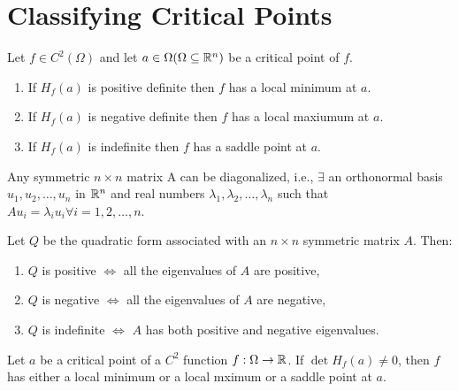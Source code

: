 \chapter{Classifying Critical Points}


\begin{theorem}
    Let $f \in C^2(\Omega)$ and let $a \in \Omega (\Omega \subseteq \mathbb{R}^n)$ be a critical point of $f$.
    \begin{enumerate}
        \item If $H_f(a)$ is positive definite then $f$ has a local minimum at $a$.
        \item If $H_f(a)$ is negative definite then $f$ has a local maxiumum at $a$.
        \item If $H_f(a)$ is indefinite then $f$ has a saddle point at $a$.
    \end{enumerate}
\end{theorem}

\begin{recall}
    Any symmetric $n \times n$ matrix A can be diagonalized, i.e., $\exists$ an orthonormal basis $u_1, u_2, \dots, u_n$ in $\mathbb{R}^n$ and real numbers $\lambda_1, \lambda_2, \dots, \lambda_n$ such that $A u_i = \lambda_i u_i \forall i = 1, 2, \dots, n$.
\end{recall}

\begin{proposition}
    Let $Q$ be the quadratic form associated with an $n \times n$ symmetric matrix $A$. Then:
    \begin{enumerate}
        \item $Q$ is positive $\iff$ all the eigenvalues of $A$ are positive,
        \item $Q$ is negative $\iff$ all the eigenvalues of $A$ are negative,
        \item $Q$ is indefinite $\iff$ $A$ has both positive and negative eigenvalues.
    \end{enumerate}
\end{proposition}

\begin{corollary}
    Let $a$ be a critical point of a $C^2$ function $f: \Omega \to \mathbb{R}$. If $\det H_f(a) \neq 0$, then $f$ has either a local minimum or a local mximum or a saddle point at $a$.
\end{corollary}

